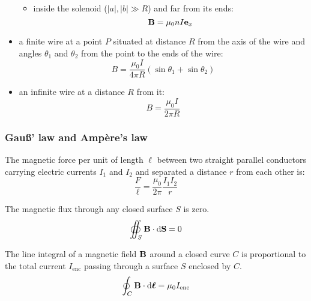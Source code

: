 \documentclass[../../../main.tex]{subfiles}
\begin{document}
\begin{multicols}{2}
\begin{prop}
\begin{itemize}
\begin{itemize}
                            \begin{center}
                                \begin{minipage}{\linewidth}
                                    \centering
                                    
                                \end{minipage}
                            \end{center}
                      \item inside the solenoid ($|a|,|b|\gg R$) and far from its ends: $$\boldsymbol{\mathrm{B}}=\mu_0 nI\boldsymbol{\mathrm{e}}_x$$
                  \end{itemize}
            \item a finite wire at a point $P$ situated at distance $R$ from the axis of the wire and angles $\theta_1$ and $\theta_2$ from the point to the ends of the wire: $$B=\frac{\mu_0I}{4\pi R}(\sin\theta_1+\sin\theta_2)$$
                  \begin{center}
                      \begin{minipage}{\linewidth}
                          \centering
                          
                      \end{minipage}
                  \end{center}
            \item an infinite wire at a distance $R$ from it: $$B=\frac{\mu_0I}{2\pi R}$$
        \end{itemize}
    \end{prop}
    \subsubsection*{Gau\ss' law and Ampère's law}
    \begin{prop}
        The magnetic force per unit of length $\ell$ between two straight parallel conductors carrying electric currents $I_1$ and $I_2$ and separated a distance $r$ from each other is: $$\frac{F}{\ell}=\frac{\mu_0}{2\pi}\frac{I_1I_2}{r}$$
    \end{prop}
    \begin{law}
        The magnetic flux through any closed surface $S$ is zero.
        $$\oiint_S\boldsymbol{\mathrm{B}}\cdot\dd\boldsymbol{\mathrm{S}}=0$$
    \end{law}
    \begin{law}
        The line integral of a magnetic field $\boldsymbol{\mathrm{B}}$ around a closed curve $C$ is proportional to the total current $I_\text{enc}$ passing through a surface $S$ enclosed by $C$.
        $$\oint_C\boldsymbol{\mathrm{B}}\cdot\dd\vb*{\ell}=\mu_0I_\text{enc}$$
    \end{law}

\end{multicols}
\end{document}
